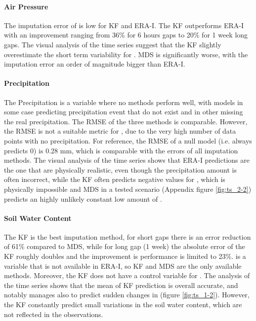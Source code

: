 \documentclass{article}
\begin{document}
\paragraph{Air Pressure} The imputation error of  is low for KF and ERA-I. The KF outperforms ERA-I with an improvement ranging from 36\% for 6 hours gaps to 20\% for 1 week long gaps. The visual analysis of the time series suggest that the KF slightly overestimate the short term variability for . MDS is significantly worse, with the imputation error an order of magnitude bigger than ERA-I.

\paragraph{Precipitation} The Precipitation is a variable where no methods perform well, with models in some case predicting precipitation event that do not exist and in other missing the real precipitation. The RMSE of the three methods is comparable. However, the RMSE is not a suitable metric for , due to the very high number of data points with no precipitation. For reference, the RMSE of a null model (i.e. always predicts 0) is 0.28 \si{mm}, which is comparable with the errors of all imputation methods. 
The visual analysis of the time series shows that ERA-I predictions are the one that are physically realistic, even though the precipitation amount is often incorrect, while the KF often predicts negative values for , which is physically impossible and MDS in a tested scenario (Appendix figure \ref{fig:ts_2-2}) predicts an highly unlikely constant low amount of .

\paragraph{Soil Water Content} The KF is the best imputation method, for short gaps there is an error reduction of 61\% compared to MDS, while for long gap (1 week) the absolute error of the KF roughly doubles and the improvement is performance is limited to 23\%.  is a variable that is not available in ERA-I, so KF and MDS are the only available methods. Moreover, the KF does not have a control variable for .
The analysis of the time series shows that the mean of KF prediction is overall accurate, and notably manages also to predict sudden changes in  (figure \ref{fig:ts_1-2}). However, the KF constantly predict small variations in the soil water content, which are not reflected in the observations.
\end{document}
